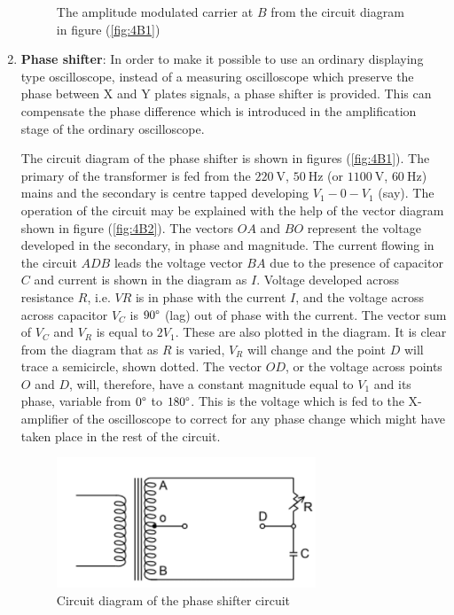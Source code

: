 \documentclass[%
 reprint,
nofootinbib,
 amsmath,amssymb,
 aps,
floatfix,
]{revtex4-2}
\begin{document}
\begin{enumerate}
\begin{figure}
            \caption{The amplitude modulated carrier at $B$ from the circuit diagram in figure (\ref{fig:4B1})}
            \label{fig:4AatB}
        \end{figure}
        \item \textbf{Phase shifter}: In order to make it possible to use an ordinary displaying type oscilloscope, instead of a measuring oscilloscope which preserve the phase between X and Y plates signals, a phase shifter is provided. This can compensate the phase difference which is introduced in the amplification stage of the ordinary oscilloscope.
        \par
        The circuit diagram of the phase shifter is shown in figures (\ref{fig:4B1}). The primary of the transformer is fed from the $\SI{220}{\volt}$, $\SI{50}{\hertz}$ (or $\SI{1100}{\volt}$, $\SI{60}{\hertz}$) mains and the secondary is centre tapped developing $V_1 - 0 - V_1$ (say). The operation of the circuit may be explained with the help of the vector diagram shown in figure (\ref{fig:4B2}). The vectors $OA$ and $BO$ represent the voltage developed in the secondary, in phase and magnitude. The current flowing in the circuit $ADB$ leads the voltage vector $BA$ due to the presence of capacitor $C$ and current is shown in the diagram as $I$. Voltage developed across resistance $R$, i.e. $VR$ is in phase with the current $I$, and the voltage across across capacitor $V_C$ is $90 \degree$ (lag) out of phase with the current. The vector sum of $V_C$ and $V_R$ is equal to $2 V_1$. These are also plotted in the diagram. It is clear from the diagram that as $R$ is varied, $V_R$ will change and the point $D$ will trace a semicircle, shown dotted. The vector $OD$, or the voltage across points $O$ and $D$, will, therefore, have a constant magnitude equal to $V_1$ and its phase, variable from $0 \degree$ to $180 \degree$. This is the voltage which is fed to the X-amplifier of the oscilloscope to correct for any phase change which might have taken place in the rest of the circuit.
        \begin{figure}
            \centering
            \includegraphics{Figures/fig4B1.png}
            \caption{Circuit diagram of the phase shifter circuit}

\end{figure}
\end{enumerate}
\end{document}

